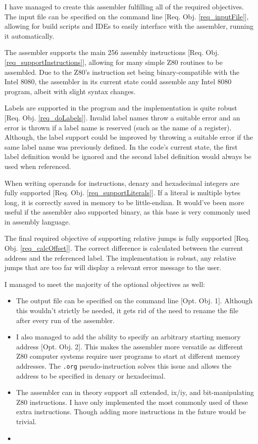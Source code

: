\documentclass[a4paper]{report}
\begin{document}
I have managed to create this assembler fulfilling all of the required
objectives. The input file can be specified on the command line [Req. Obj.
\ref{req_inputFile}], allowing for build scripts and IDEs to easily interface
with the assembler, running it automatically.

The assembler supports the main 256 assembly instructions [Req. Obj.
\ref{req_supportInstructions}], allowing for many simple Z80 routines to be
assembled. Due to the Z80's instruction set being binary-compatible with the
Intel 8080, the assembler in its current state could assemble any Intel 8080
program, albeit with slight syntax changes.

Labels are supported in the program and the implementation is quite robust
[Req. Obj. \ref{req_doLabels}].
Invalid label names throw a suitable error and an error is thrown if a label
name is reserved (such as the name of a register). Although, the label support
could be improved by throwing a suitable error if the same label name was
previously defined. In the code's current state, the first label definition
would be ignored and the second label definition would always be used when
referenced.

When writing operands for instructions, denary and hexadecimal integers are
fully supported [Req. Obj. \ref{req_supportLiterals}]. If a literal is multiple bytes long,
it is correctly saved in memory to be little-endian. It would've been more
useful if the assembler also supported binary, as this base is very commonly
used in assembly language.

The final required objective of supporting relative jumps is fully supported
[Req. Obj. \ref{req_calcOffset}].
The correct difference is calculated between the current address and the
referenced label. The implementation is robust, any relative jumps that are too
far will display a relevant error message to the user.

\bigskip

I managed to meet the majority of the optional objectives as well:

\begin{itemize}
	\item
The output file can be specified on the command line
[Opt. Obj. 1]. Although this wouldn't
strictly be needed, it gets rid of the need to rename the file after every
run of the assembler.
	\item
I also managed to add the ability to specify an arbitrary starting memory
address [Opt. Obj. 2]. This makes the assembler more versatile as different Z80
computer systems require user programs to start at different memory addresses.
The \texttt{.org} pseudo-instruction solves this issue and allows the
address to be specified in denary or hexadecimal.
	\item
The assembler can in theory support all extended, ix/iy, and bit-manipulating
Z80 instructions. I have only implemented the most commonly used of these
extra instructions. Though adding more instructions in the future would be
trivial.
	\item
\end{itemize}
\end{document}
